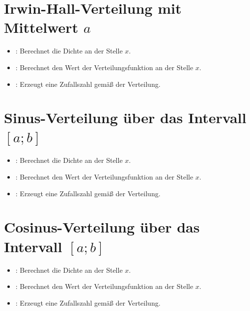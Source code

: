 \section{Irwin-Hall-Verteilung mit Mittelwert \texorpdfstring{$a$}{n}}

\begin{itemize}

\item
{}:
Berechnet die Dichte an der Stelle $x$.

\item
{}:
Berechnet den Wert der Verteilungsfunktion an der Stelle $x$.

\item
{}:
Erzeugt eine Zufallszahl gemäß der Verteilung.

\end{itemize}



\section{Sinus-Verteilung über das Intervall \texorpdfstring{$[a;b]$}{[a;b]}}

\begin{itemize}

\item
{}:
Berechnet die Dichte an der Stelle $x$.

\item
{}:
Berechnet den Wert der Verteilungsfunktion an der Stelle $x$.

\item
{}:
Erzeugt eine Zufallszahl gemäß der Verteilung.

\end{itemize}



\section{Cosinus-Verteilung über das Intervall \texorpdfstring{$[a;b]$}{[a;b]}}

\begin{itemize}

\item
{}:
Berechnet die Dichte an der Stelle $x$.

\item
{}:
Berechnet den Wert der Verteilungsfunktion an der Stelle $x$.

\item
{}:
Erzeugt eine Zufallszahl gemäß der Verteilung.

\end{itemize}



